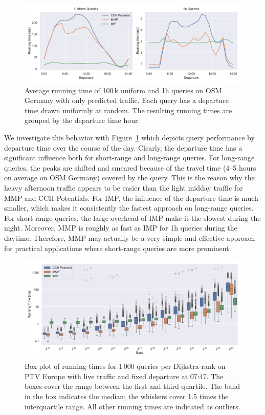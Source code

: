 \documentclass[a4paper,UKenglish,cleveref, autoref, thm-restate,anonymous]{lipics-v2021}
\begin{document}
\begin{figure}[tbh]
\centering
\includegraphics[width=\linewidth]{fig/perf_over_day.pdf}
\caption{
Average running time of 100\,k uniform and 1h queries on OSM Germany with only predicted traffic.
Each query has a departure time drawn uniformly at random.
The resulting running times are grouped by the departure time hour.
}\label{fig:by_dep}
\end{figure}

We investigate this behavior with Figure~\ref{fig:by_dep} which depicts query performance by departure time over the course of the day.
Clearly, the departure time has a significant influence both for short-range and long-range queries.
For long-range queries, the peaks are shifted and smeared because of the travel time (4--5 hours on average on OSM Germany) covered by the query.
This is the reason why the heavy afternoon traffic appears to be easier than the light midday traffic for MMP and CCH-Potentials.
For IMP, the influence of the departure time is much smaller, which makes it consistently the fastest approach on long-range queries.
For short-range queries, the large overhead of IMP make it the slowest during the night.
Moreover, MMP is roughly as fast as IMP for 1h queries during the daytime.
Therefore, MMP may actually be a very simple and effective approach for practical applications where short-range queries are more prominent.

\begin{figure}[!b]
\centering
\includegraphics[width=\linewidth]{fig/ranks.pdf}
\caption{
Box plot of running times for 1\,000 queries per Dijkstra-rank on PTV Europe with live traffic and fixed departure at 07:47.
The boxes cover the range between the first and third quartile.
The band in the box indicates the median; the whiskers cover 1.5 times the interquartile range.
All other running times are indicated as outliers.
}\label{fig:ranks}
\end{figure}
\end{document}
